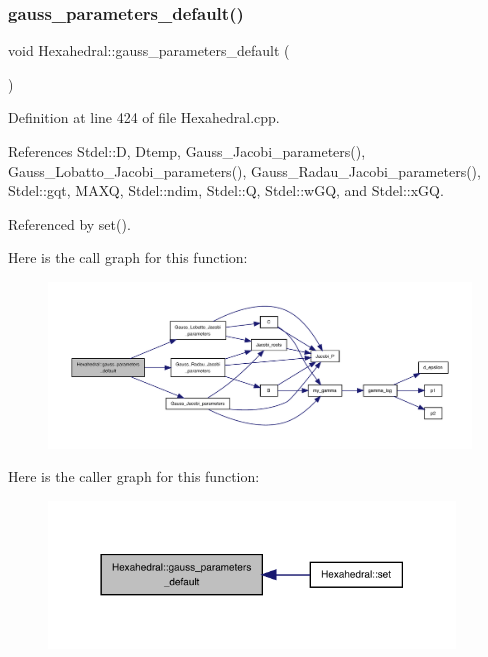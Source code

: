 \subsubsection{\texorpdfstring{gauss\+\_\+parameters\+\_\+default()}{gauss\_parameters\_default()}}
{\footnotesize\ttfamily void Hexahedral\+::gauss\+\_\+parameters\+\_\+default (\begin{DoxyParamCaption}{ }\end{DoxyParamCaption})\hspace{0.3cm}{\ttfamily [private]}}



Definition at line 424 of file Hexahedral.\+cpp.



References Stdel\+::D, Dtemp, Gauss\+\_\+\+Jacobi\+\_\+parameters(), Gauss\+\_\+\+Lobatto\+\_\+\+Jacobi\+\_\+parameters(), Gauss\+\_\+\+Radau\+\_\+\+Jacobi\+\_\+parameters(), Stdel\+::gqt, M\+A\+XQ, Stdel\+::ndim, Stdel\+::Q, Stdel\+::w\+GQ, and Stdel\+::x\+GQ.



Referenced by set().

Here is the call graph for this function\+:
\nopagebreak
\begin{figure}[H]
\begin{center}
\leavevmode
\includegraphics[width=350pt]{classHexahedral_a6c04539f29299a71e90ba1860adf702b_cgraph}
\end{center}
\end{figure}
Here is the caller graph for this function\+:
\nopagebreak
\begin{figure}[H]
\begin{center}
\leavevmode
\includegraphics[width=306pt]{classHexahedral_a6c04539f29299a71e90ba1860adf702b_icgraph}
\end{center}
\end{figure}
\mbox{\label{classStdel_a0775d0c4f7f15ae26bd45fc949e6f6b9}} 
